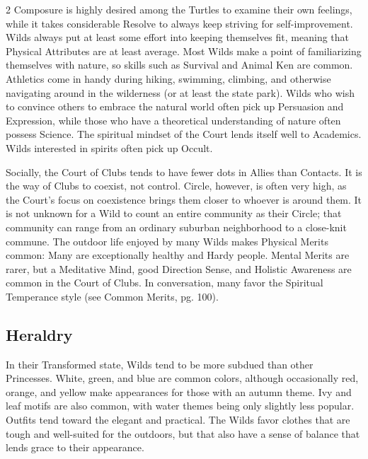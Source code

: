\begin{multicols}{2}
Composure is highly desired among the Turtles to examine their own feelings, while it takes considerable Resolve to always keep striving for self-improvement. Wilds always put at least some effort into keeping themselves fit, meaning that Physical Attributes are at least average. Most Wilds make a point of familiarizing themselves with nature, so skills such as Survival and Animal Ken are common. Athletics come in handy during hiking, swimming, climbing, and otherwise navigating around in the wilderness (or at least the state park). Wilds who wish to convince others to embrace the natural world often pick up Persuasion and Expression, while those who have a theoretical understanding of nature often possess Science. The spiritual mindset of the Court lends itself well to Academics. Wilds interested in spirits often pick up Occult.

Socially, the Court of Clubs tends to have fewer dots in Allies than Contacts. It is the way of Clubs to coexist, not control. Circle, however, is often very high, as the Court's focus on coexistence brings them closer to whoever is around them. It is not unknown for a Wild to count an entire community as their Circle; that community can range from an ordinary suburban neighborhood to a close-knit commune. The outdoor life enjoyed by many Wilds makes Physical Merits common: Many are exceptionally healthy and Hardy people. Mental Merits are rarer, but a Meditative Mind, good Direction Sense, and Holistic Awareness are common in the Court of Clubs. In conversation, many favor the Spiritual Temperance style (see Common Merits, pg. 100). 

\subsection*{Heraldry}

In their Transformed state, Wilds tend to be more subdued than other Princesses. White, green, and blue are common colors, although occasionally red, orange, and yellow make appearances for those with an autumn theme. Ivy and leaf motifs are also common, with water themes being only slightly less popular. Outfits tend toward the elegant and practical. The Wilds favor clothes that are tough and well-suited for the outdoors, but that also have a sense of balance that lends grace to their appearance.


\end{multicols}
